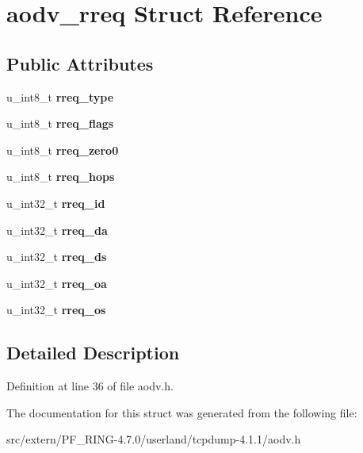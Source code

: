 \hypertarget{structaodv__rreq}{
\section{aodv\_\-rreq Struct Reference}
\label{structaodv__rreq}
}
\subsection*{Public Attributes}
\begin{DoxyCompactItemize}
\item 
\hypertarget{structaodv__rreq_a33d5924c45fd8011017718c080adec51}{
u\_\-int8\_\-t {\bfseries rreq\_\-type}}
\label{structaodv__rreq_a33d5924c45fd8011017718c080adec51}

\item 
\hypertarget{structaodv__rreq_a8010e288260c25357917ba9a1432b95a}{
u\_\-int8\_\-t {\bfseries rreq\_\-flags}}
\label{structaodv__rreq_a8010e288260c25357917ba9a1432b95a}

\item 
\hypertarget{structaodv__rreq_a0732030e7694f23ecf2f45d69c1213ae}{
u\_\-int8\_\-t {\bfseries rreq\_\-zero0}}
\label{structaodv__rreq_a0732030e7694f23ecf2f45d69c1213ae}

\item 
\hypertarget{structaodv__rreq_aef4227a8755c36521785d6bb69b06b7a}{
u\_\-int8\_\-t {\bfseries rreq\_\-hops}}
\label{structaodv__rreq_aef4227a8755c36521785d6bb69b06b7a}

\item 
\hypertarget{structaodv__rreq_a94c7f17465f738f7dc7717e49d501f25}{
u\_\-int32\_\-t {\bfseries rreq\_\-id}}
\label{structaodv__rreq_a94c7f17465f738f7dc7717e49d501f25}

\item 
\hypertarget{structaodv__rreq_a986b41bbb8d730f9476a33809b9db1f4}{
u\_\-int32\_\-t {\bfseries rreq\_\-da}}
\label{structaodv__rreq_a986b41bbb8d730f9476a33809b9db1f4}

\item 
\hypertarget{structaodv__rreq_afe92661d1a0b51ccc431c0c76fd68d01}{
u\_\-int32\_\-t {\bfseries rreq\_\-ds}}
\label{structaodv__rreq_afe92661d1a0b51ccc431c0c76fd68d01}

\item 
\hypertarget{structaodv__rreq_ad987f3c3635e3bb9a754703770865c72}{
u\_\-int32\_\-t {\bfseries rreq\_\-oa}}
\label{structaodv__rreq_ad987f3c3635e3bb9a754703770865c72}

\item 
\hypertarget{structaodv__rreq_ab25a5fd7f0621f0e33751ac033307a4e}{
u\_\-int32\_\-t {\bfseries rreq\_\-os}}
\label{structaodv__rreq_ab25a5fd7f0621f0e33751ac033307a4e}

\end{DoxyCompactItemize}


\subsection{Detailed Description}


Definition at line 36 of file aodv.h.



The documentation for this struct was generated from the following file:\begin{DoxyCompactItemize}
\item 
src/extern/PF\_\-RING-\/4.7.0/userland/tcpdump-\/4.1.1/aodv.h\end{DoxyCompactItemize}
